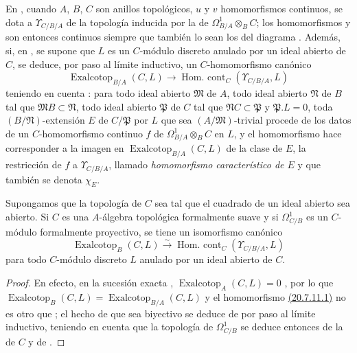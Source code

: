 \begin{env}[20.7.10]
\label{0.20.7.10-fr}
En , cuando $A$, $B$, $C$ son anillos topológicos,
$u$ y $v$ homomorfismos continuos, se dota a $\Upsilon_{C/B/A}$ de la
topología inducida por la de $\Omega^1_{B/A}\otimes_B C$; los
homomorfismos  y  son entonces
continuos siempre que también lo sean los del diagrama
. Además, si, en , se supone que
$L$ es un $C$-módulo discreto anulado por un ideal abierto de $C$, se deduce,
por paso al límite inductivo, un $C$-homomorfismo canónico
\begin{equation}
\tag{20.7.10.1}
\label{0.20.7.10.1-fr}
  \operatorname{Exalcotop}_{B/A}(C,L)\to
  \operatorname{Hom.\ cont}_C(\Upsilon_{C/B/A},L)
\end{equation}
teniendo en cuenta : para todo ideal abierto
$\mathfrak{M}$ de $A$, todo ideal abierto $\mathfrak{N}$ de $B$ tal que
$\mathfrak{M}B\subset\mathfrak{N}$, todo ideal abierto $\mathfrak{P}$ de $C$
tal que $\mathfrak{N}C\subset\mathfrak{P}$ y $\mathfrak{P}.L=0$, toda
$(B/\mathfrak{N})$-extensión $E$ de $C/\mathfrak{P}$ por $L$ que sea
$(A/\mathfrak{M})$-trivial procede de los datos de un $C$-homomorfismo
continuo $f$ de $\Omega^1_{B/A}\otimes_B C$ en $L$, y el homomorfismo
 hace corresponder a la imagen en
$\operatorname{Exalcotop}_{B/A}(C,L)$ de la clase de $E$, la restricción de
$f$ a $\Upsilon_{C/B/A}$, llamado \emph{homomorfismo característico de $E$}
y que también se denota $\chi_E$.
\end{env}

\begin{proposition}[20.7.11]
\label{0.20.7.11-fr}
Supongamos que la topología de $C$ sea tal que el cuadrado de un ideal abierto
sea abierto. Si $C$ es una $A$-álgebra topológica formalmente suave y si
$\Omega^1_{C/B}$ es un $C$-módulo formalmente proyectivo, se tiene un
isomorfismo canónico
\begin{equation}
\tag{20.7.11.1}
\label{0.20.7.11.1-fr}
  \operatorname{Exalcotop}_B(C,L)\xrightarrow{\sim}
  \operatorname{Hom.\ cont}_C(\Upsilon_{C/B/A},L)
\end{equation}
para todo $C$-módulo discreto $L$ anulado por un ideal abierto de $C$.
\end{proposition}

\begin{proof}
En efecto, en la sucesión exacta ,
$\operatorname{Exalcotop}_A(C,L)=0$ , por lo que
$\operatorname{Exalcotop}_B(C,L)=\operatorname{Exalcotop}_{B/A}(C,L)$ y
el homomorfismo \hyperref[0.20.7.8.1-fr]{\textup{(20.7.11.1)}} no es otro que
; el hecho de que sea biyectivo se deduce de
 por paso al límite inductivo, teniendo en cuenta que
la topología de $\Omega^1_{C/B}$ se deduce entonces de la de $C$
 y de .
\end{proof}

